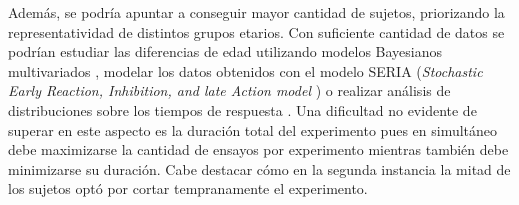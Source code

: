 Además, se podría apuntar a conseguir mayor cantidad de sujetos, priorizando la
representatividad de distintos grupos etarios.
Con suficiente cantidad de datos se podrían estudiar las diferencias de edad
utilizando modelos Bayesianos multivariados
\cite{plomecka_2020_retest_reliability}, modelar los datos obtenidos con el
modelo SERIA (\textit{Stochastic Early Reaction, Inhibition, and late Action
model} \cite{aponte_2017_seria}) o realizar análisis de distribuciones sobre
los tiempos de respuesta \cite{unsworth_2011_distribution_analysis}.
Una dificultad no evidente de superar en este aspecto es la duración total del
experimento pues en simultáneo debe maximizarse la cantidad de ensayos por
experimento mientras también debe minimizarse su duración.
Cabe destacar cómo en la segunda instancia la mitad de los sujetos optó por
cortar tempranamente el experimento.

